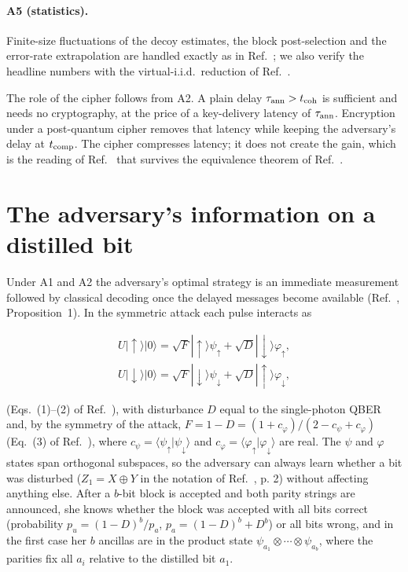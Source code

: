 \documentclass[aps,pra,twocolumn,superscriptaddress,nofootinbib]{revtex4-2}
\begin{document}
\paragraph*{A5 (statistics).} Finite-size fluctuations of the decoy estimates, the block post-selection and the error-rate extrapolation are handled exactly as in Ref.~\cite{T25}; we also verify the headline numbers with the virtual-i.i.d.\ reduction of Ref.~\cite{Jiang21}.

The role of the cipher follows from A2. A plain delay $\tau_{\rm ann}>t_{\rm coh}$ is sufficient and needs no cryptography, at the price of a key-delivery latency of $\tau_{\rm ann}$. Encryption under a post-quantum cipher removes that latency while keeping the adversary's delay at $t_{\rm comp}$. The cipher compresses latency; it does not create the gain, which is the reading of Ref.~\cite{PK23} that survives the equivalence theorem of Ref.~\cite{Novak25}.
\section{The adversary's information on a distilled bit}\label{sec:eve}
Under A1 and A2 the adversary's optimal strategy is an immediate measurement followed by classical decoding once the delayed messages become available (Ref.~\cite{VA20}, Proposition~1). In the symmetric attack each pulse interacts as

\begin{align}
U|\!\uparrow\rangle|0\rangle=\sqrt{F}|\!\uparrow\rangle\psi_\uparrow+\sqrt{D}|\!\downarrow\rangle\varphi_\uparrow,\\
U|\!\downarrow\rangle|0\rangle=\sqrt{F}|\!\downarrow\rangle\psi_\downarrow+\sqrt{D}|\!\uparrow\rangle\varphi_\downarrow,
\end{align}

(Eqs.~(1)--(2) of Ref.~\cite{GW99}), with disturbance $D$ equal to the single-photon QBER and, by the symmetry of the attack, $F=1-D=(1+c_\varphi)/(2-c_\psi+c_\varphi)$ (Eq.~(3) of Ref.~\cite{GW99}), where $c_\psi=\langle\psi_\uparrow|\psi_\downarrow\rangle$ and $c_\varphi=\langle\varphi_\uparrow|\varphi_\downarrow\rangle$ are real. The $\psi$ and $\varphi$ states span orthogonal subspaces, so the adversary can always learn whether a bit was disturbed ($Z_1=X\oplus Y$ in the notation of Ref.~\cite{GW99}, p. 2) without affecting anything else. After a $b$-bit block is accepted and both parity strings are announced, she knows whether the block was accepted with all bits correct (probability $p_u=(1-D)^b/p_a$, $p_a=(1-D)^b+D^b$) or all bits wrong, and in the first case her $b$ ancillas are in the product state $\psi_{a_1}\otimes\cdots\otimes\psi_{a_b}$, where the parities fix all $a_i$ relative to the distilled bit $a_1$.
\end{document}

